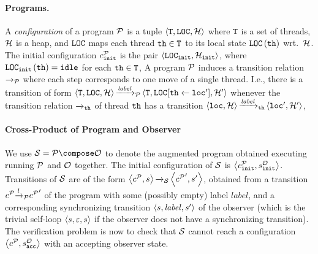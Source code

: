\paragraph{Programs.}
A {\it configuration} of a program
${\mathcal P}$ is a tuple
$\left\langle{\tt T},{\tt LOC},{\mathcal H}\right\rangle$ where
${\tt T}$ is a set of threads,
${\mathcal H}$ is a heap, and
${\tt LOC}$
maps each thread ${\tt th}\in{\tt T}$ to its
local state ${\tt LOC}\left({\tt th}\right)$ wrt.\ ${\mathcal H}$.
%
%
The initial configuration
$c_{\tt init}^{{\mathcal P}}$ 
is the pair
$\left\langle{\tt LOC}_{\tt init},{\mathcal H}_{\tt init}\right\rangle$,
where
${\tt LOC}_{\tt init}\left({\tt th}\right)={\tt idle}$ for each
${\tt th}\in{\tt T}$,
%
A program ${\mathcal P}$ induces a transition relation
${\xrightarrow{}{}}_{\!\!{\mathcal P}}$ where each step corresponds to one move of a single thread.
I.e., 
there is a transition of form
$\left\langle{\tt T},{\tt LOC},{\mathcal H}\right\rangle
{\xrightarrow{\mathit{label}}{}}_{\!\!{\mathcal P}}
\left\langle{\tt T},{\tt LOC}[{\tt th}\leftarrow{\tt loc}'],{\mathcal H}'\right\rangle$
whenever the transition relation ${\xrightarrow{}{}}_{\!\!{\tt th}}$ of thread ${\tt th}$
has a transition
$\left\langle{\tt loc},{\mathcal H}\right\rangle{\xrightarrow{\mathit{label}}{}}_{\!\!{\tt th}}\left\langle{\tt loc}',{\mathcal H}'\right\rangle$,
%

\paragraph{Cross-Product of Program and Observer}
We use $\system=\prog\compose\observer$ to denote the augmented program obtained
executing running ${\mathcal P}$ and ${\mathcal O}$ together.
%
The initial configuration of ${\mathcal S}$ is
$\left\langle c_{\tt init}^{{\mathcal P}},s^{\mathcal O}_{\tt init}\right\rangle$.
Transitions of ${\mathcal S}$ are of the form
$\left\langle c^{{\mathcal P}},s\right\rangle{\xrightarrow{}{}}_{\!\!{\mathcal S}}\left\langle{c^{{\mathcal P}}}',s'\right\rangle$,
obtained from a transition
$c^{{\mathcal P}} {\xrightarrow{l}{}}_{\!\!{\mathcal P}} {c^{{\mathcal P}}}'$ of the program with some (possibly empty)
label $\mathit{label}$, and
a corresponding synchronizing transition
$\left\langle s,\mathit{label},s'\right\rangle$
of the observer
(which is the trivial self-loop $\left\langle s,\mathit{\varepsilon},s\right\rangle$
if the observer does not have a synchronizing transition).
The verification problem is now to check that ${\mathcal S}$ cannot reach
a configuration $\left\langle c^{{\mathcal P}},s^{\mathcal O}_{\tt acc}\right\rangle$ with an accepting
observer state.










